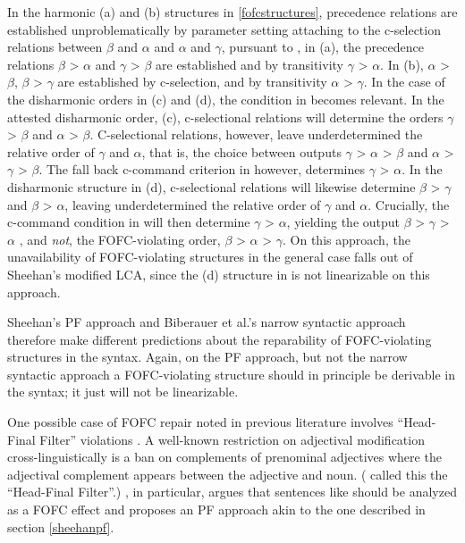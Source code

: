 \documentclass[output=paper]{langscibook}
\begin{document}
In the harmonic (a) and (b) structures in \protect\ref{fofcstructures}, precedence relations are established unproblematically by parameter setting attaching to the c-selection relations between $\beta$ and $\alpha$ and $\alpha$ and $\gamma$, pursuant to \Last[i], in (a), the precedence relations {$\beta$ > $\alpha$ and  $\gamma$ > $\beta$} are established and by transitivity $\gamma$ > $\alpha$. In (b), {$\alpha$ > $\beta$, $\beta$ > $\gamma$} are established by c-selection, and by transitivity $\alpha$ > $\gamma$. In the case of the disharmonic orders in (c) and (d), the condition in \Last[ii] becomes relevant.  In the attested disharmonic order, (c), c-selectional relations will determine the orders $\gamma$ > $\beta$ and $\alpha$ > $\beta$.  C-selectional relations, however, leave underdetermined the relative order of $\gamma$ and $\alpha$, that is, the choice between outputs $\gamma$ > $\alpha$ > $\beta$ and $\alpha$ > $\gamma$ > $\beta$.  The fall back c-command criterion in \Last[ii] however, determines $\gamma$ > $\alpha$. In the disharmonic structure in (d), c-selectional relations will likewise determine $\beta$ > $\gamma$ and $\beta$ > $\alpha$, leaving underdetermined the relative order of $\gamma$ and $\alpha$.  Crucially, the c-command condition in  \Last[ii] will then determine $\gamma$ > $\alpha$, yielding the output $\beta$ > $\gamma$ > $\alpha$ , and \textit{not}, the FOFC-violating order, $\beta$ > $\alpha$ > $\gamma$.  On this approach, the unavailability of FOFC-violating structures in the general case falls out of Sheehan's modified LCA, since the (d) structure in \Last is not linearizable on this approach.\protect\footnotemark\protect{}
	
Sheehan's PF approach and Biberauer et al.'s narrow syntactic approach therefore make different predictions about the reparability of FOFC-violating structures in the syntax.  Again, on the PF approach, but not the narrow syntactic approach a FOFC-violating structure should in principle be derivable in the syntax; it just will not be linearizable.  

One possible case of FOFC repair noted in previous literature involves ``Head-Final Filter'' violations \citep{greenberg1963, williams1982, sheehan2012b}.  A well-known restriction on adjectival modification cross-linguistically is a ban on complements of prenominal adjectives where the adjectival complement appears between the adjective and noun. (\cite{williams1982} called this the ``Head-Final Filter''.)  \cite{sheehan2012b}, in particular, argues that sentences like \Next[c] should be analyzed as a FOFC effect and proposes an PF approach akin to the one described in section \protect\ref{sheehanpf}.
\end{document}
